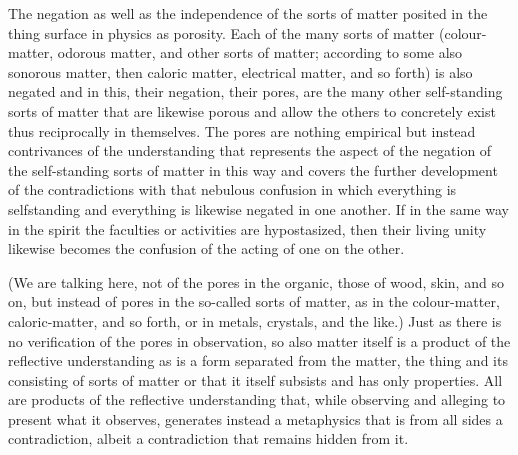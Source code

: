 The negation as well as the independence of the sorts of matter
posited in the thing surface in physics as porosity.
Each of the many sorts of matter
(colour-matter, odorous matter, and other sorts of matter;
according to some also sonorous matter, then caloric matter,
electrical matter, and so forth)
is also negated and in this, their negation,
their pores, are the many other self-standing sorts of
matter that are likewise porous and allow the others to concretely
exist thus reciprocally in themselves.
The pores are nothing empirical but instead contrivances of
the understanding that represents the
aspect of the negation of the self-standing sorts of matter in this
way and covers the further development of the contradictions with
that nebulous confusion in which everything is selfstanding and
everything is likewise negated in one another.
If in the same way in the spirit
the faculties or activities are hypostasized,
then their living unity likewise becomes
the confusion of the acting of one on the other.

(We are talking here, not of the pores in the organic,
those of wood, skin, and so on, but instead of pores
in the so-called sorts of matter, as in the colour-matter,
caloric-matter, and so forth, or in metals, crystals, and the like.)
Just as there is no verification of the pores in observation,
so also matter itself is a product of the reflective understanding as
is a form separated from the matter, the thing and its consisting of
sorts of matter or that it itself subsists and has only properties.
All are products of the reflective understanding that,
while observing and alleging to present what it observes,
generates instead a metaphysics that is from all sides a contradiction,
albeit a contradiction that remains hidden from it.
